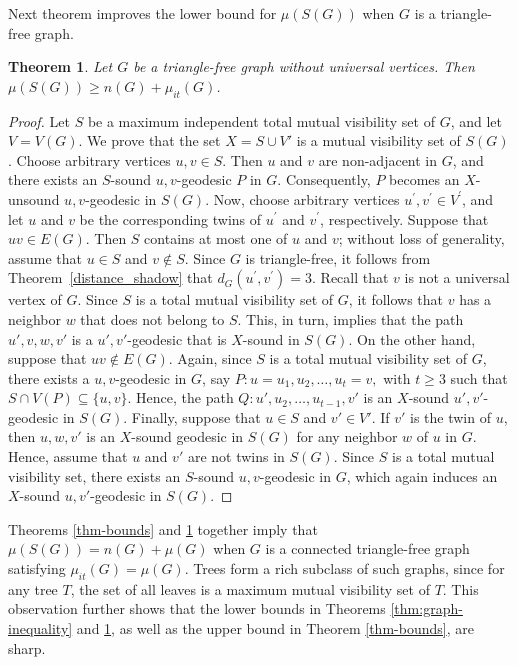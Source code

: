 \documentclass[a4paper,12pt]{article}
\newtheorem{theorem}{Theorem}[section]
\begin{document}
{ Next theorem improves the lower bound for $\mu(S(G))$ when $G$ is a triangle-free graph.
 \begin{theorem}\label{muit-bound}
  Let $G$ be a triangle-free graph without universal vertices. Then $\mu(S(G)) \geq n(G) + \mu_{it}(G)$.
\end{theorem}
\begin{proof}
Let $S$ be a maximum independent total mutual visibility set of $G$, and let $V=V(G)$. 
We prove that the set $X = S \cup V'$ is a mutual visibility set of $S(G)$. 
Choose arbitrary vertices $u,v \in S$. 
Then $u$ and $v$ are non-adjacent in $G$, and there exists an $S$-sound $u,v$-geodesic $P$ in $G$. 
Consequently, $P$ becomes an $X$-unsound $u,v$-geodesic in $S(G)$.
 Now, choose arbitrary vertices $u^{\prime}, v^{\prime} \in V^{\prime}$, and let $u$ and $v$ be the corresponding twins of $u^{\prime}$ and $v^{\prime}$, respectively. Suppose that $uv \in E(G)$. Then $S$ contains at most one of $u$ and $v$; without loss of generality, assume that $u \in S$ and $v \notin S$. Since $G$ is triangle-free, it follows from Theorem~\ref{distance_shadow} that $d_G(u^{\prime}, v^{\prime}) = 3$.
  Recall that $v$ is not a universal vertex of $G$. Since $S$ is a total mutual visibility set of $G$, it follows that $v$ has a neighbor $w$ that does not belong to $S$. This, in turn, implies that the path $u',v,w,v'$ is a $u',v'$-geodesic that is $X$-sound in $S(G)$.
On the other hand, suppose that $uv \notin E(G)$. Again, since $S$ is a total mutual visibility set of $G$, there exists a $u,v$-geodesic in $G$, say $
P : u = u_1, u_2, \dots, u_t = v,$ with $t \geq 3$ such that $S \cap V(P) \subseteq \{u,v\}$. Hence, the path $
Q : u', u_2, \dots, u_{t-1}, v'$
is an $X$-sound $u',v'$-geodesic in $S(G)$.
Finally, suppose that $u \in S$ and $v' \in V'$. If $v'$ is the twin of $u$, then $u,w,v'$ is an $X$-sound geodesic in $S(G)$ for any neighbor $w$ of $u$ in $G$. Hence, assume that $u$ and $v'$ are not twins in $S(G)$. Since $S$ is a total mutual visibility set, there exists an $S$-sound $u,v$-geodesic in $G$, which again induces an $X$-sound $u,v'$-geodesic in $S(G)$.

\end{proof}
 Theorems \ref{thm-bounds} and \ref{muit-bound} together imply that $\mu(S(G)) = n(G) + \mu(G)$ when $G$ is a connected triangle-free graph satisfying $\mu_{it}(G) = \mu(G)$. Trees form a rich subclass of such graphs, since for any tree $T$, the set of all leaves is a maximum mutual visibility set of $T$. This observation further shows that the lower bounds in Theorems \ref{thm:graph-inequality} and \ref{muit-bound}, as well as the upper bound in Theorem \ref{thm-bounds}, are sharp.



}
\end{document}
